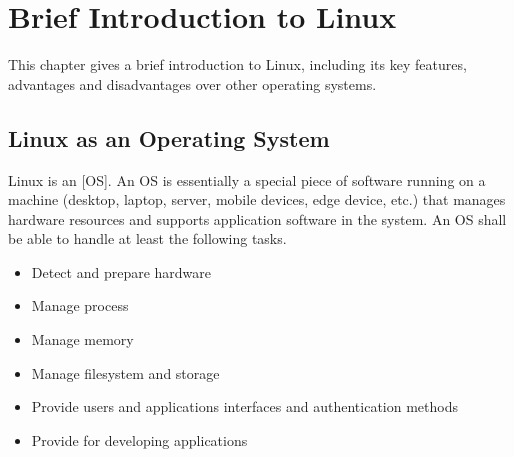 \chapter{Brief Introduction to Linux}

This chapter gives a brief introduction to Linux, including its key features, advantages and disadvantages over other operating systems.

\section{Linux as an Operating System}

Linux is an [OS]. An OS is essentially a special piece of software running on a machine (desktop, laptop, server, mobile devices, edge device, etc.) that manages hardware resources and supports application software in the system. An OS shall be able to handle at least the following tasks.
\begin{itemize}
  \item Detect and prepare hardware
  \item Manage process
  \item Manage memory
  \item Manage filesystem and storage
  \item Provide users and applications interfaces and authentication methods
  \item Provide  for developing applications
\end{itemize}

